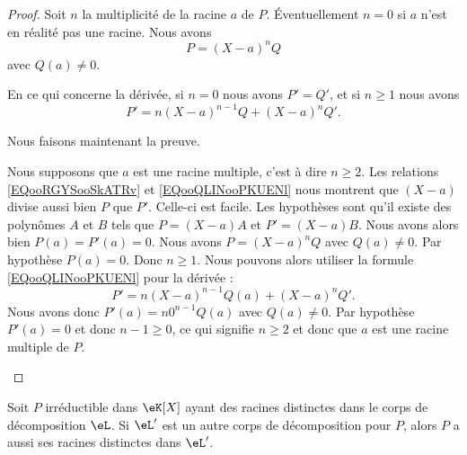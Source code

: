 \begin{proof}
	Soit \( n\) la multiplicité de la racine \( a\) de \( P\). Éventuellement \( n=0\) si \( a\) n'est en réalité pas une racine. Nous avons
	\begin{equation}        \label{EQooRGYSooSkATRv}
		P=(X-a)^nQ
	\end{equation}
	avec \( Q(a)\neq 0\).

	En ce qui concerne la dérivée, si \( n=0\) nous avons \( P'=Q'\), et si \( n\geq 1\) nous avons
	\begin{equation}        \label{EQooQLINooPKUENl}
		P'=n(X-a)^{n-1}Q+(X-a)^nQ'.
	\end{equation}

	Nous faisons maintenant la preuve.
	\begin{subproof}
		Nous supposons que \( a\) est une racine multiple, c'est à dire \( n\geq 2\). Les relations \eqref{EQooRGYSooSkATRv} et \eqref{EQooQLINooPKUENl} nous montrent que \( (X-a)\) divise aussi bien \( P\) que \( P'\).
		Celle-ci est facile. Les hypothèses sont qu'il existe des polynômes \( A\) et \( B\) tels que \( P=(X-a)A\) et \( P'=(X-a)B\). Nous avons alors bien \( P(a)=P'(a)=0\).
		Nous avons \( P=(X-a)^nQ\) avec \( Q(a)\neq 0\). Par hypothèse \( P(a)=0\). Donc \( n\geq 1\). Nous pouvons alors utiliser la formule \eqref{EQooQLINooPKUENl} pour la dérivée :
		\begin{equation}
			P'=n(X-a)^{n-1}Q(a)+(X-a)^nQ'.
		\end{equation}
		Nous avons donc \( P'(a)=n 0^{n-1}Q(a)\) avec \( Q(a)\neq 0\). Par hypothèse \( P'(a)=0\) et donc \( n-1\geq 0\), ce qui signifie \( n\geq 2\) et donc que \( a\) est une racine multiple de \( P\).
	\end{subproof}
\end{proof}


\begin{proposition}
	Soit \( P\) irréductible dans \( \eK[X]\) ayant des racines distinctes dans le corps de décomposition \( \eL\). Si \( \eL'\) est un autre corps de décomposition pour \( P\), alors \( P\) a aussi ses racines distinctes dans \( \eL'\).
\end{proposition}

